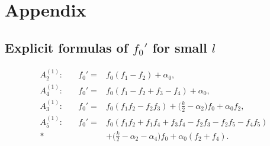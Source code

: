 \section{Appendix}

\subsection{Explicit formulas of $f_0'$ for small $l$}

\allowdisplaybreaks
\begin{eqnarray*}
A^{(1)}_2:\quad& f_0'=&f_0(f_1-f_2)+ \alpha_0,\\ 
A^{(1)}_4:\quad& f_0'=&f_0(f_1-f_2+f_3-f_4)+ \alpha_0,\\ 
A^{(1)}_3:\quad& f_0'=&f_0(f_1f_2-f_2f_3)+ 
\big(\frac{k}{2}-\alpha_2\big) f_0+\alpha_0 f_2,\\ 
A^{(1)}_5:\quad& f_0'=&f_0(f_1f_2+f_1f_4+f_3f_4-f_2f_3-f_2f_5-f_4f_5) \\*
&&+\big(\frac{k}{2}-\alpha_2-\alpha_4\big) f_0+\alpha_0 (f_2+f_4).
\end{eqnarray*}

